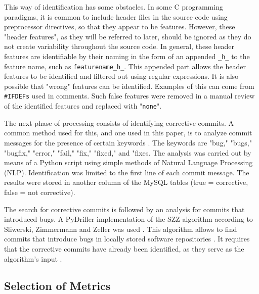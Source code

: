 This way of identification has some obstacles. In some C programming paradigms, it is common to include header files in the source code using preprocessor directives, so that they appear to be features. However, these "header features", as they will be referred to later, should be ignored as they do not create variability throughout the source code. In general, these header features are identifiable by their naming in the form of an appended \texttt{\_h\_} to the feature name, such as \texttt{featurename\_h\_}. This appended part allows the header features to be identified and filtered out using regular expressions. It is also possible that "wrong" features can be identified. Examples of this can come from \texttt{\#IFDEFs} used in comments. Such false features were removed in a manual review of the identified features and replaced with "\texttt{none}".

The next phase of processing consists of identifying corrective commits. A common method used for this, and one used in this paper, is to analyze commit messages for the presence of certain keywords \cite{Zimmermann2007}. The keywords are "bug," "bugs," "bugfix," "error," "fail," "fix," "fixed," and "fixes. The analysis was carried out by means of a Python script using simple methods of Natural Language Processing (NLP). Identification was limited to the first line of each commit message. The results were stored in another column of the MySQL tables (true = corrective, false = not corrective).

The search for corrective commits is followed by an analysis for commits that introduced bugs. A PyDriller implementation of the SZZ algorithm according to Sliwerski, Zimmermann and Zeller was used \cite{Sliwerski2005,Spadini2018}. This algorithm allows to find commits that introduce bugs in locally stored software repositories \cite{Borg2019}. It requires that the corrective commits have already been identified, as they serve as the algorithm's input \cite{Borg2019}.

\subsection{Selection of Metrics}


